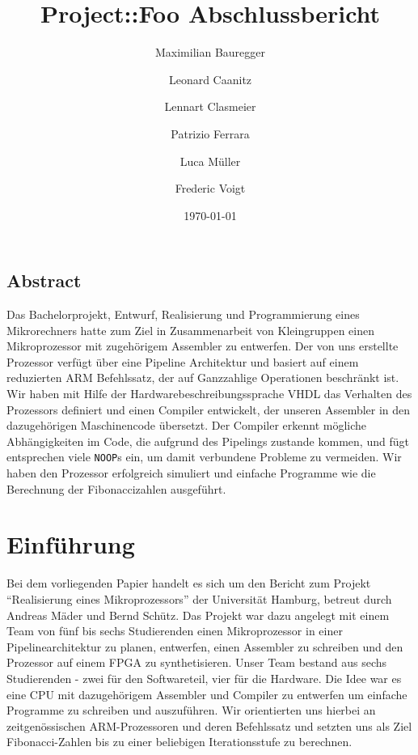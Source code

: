 \documentclass[paper=a4,fontsize=11pt,twocolumn]{scrreprt}
\title{Project::Foo Abschlussbericht}
\author{Maximilian Bauregger \and Leonard Caanitz \and Lennart Clasmeier \and Patrizio Ferrara \and Luca Müller \and Frederic Voigt}
\date{\today}
\begin{document}
\maketitle

\tableofcontents

\section*{Abstract}
Das Bachelorprojekt, Entwurf, Realisierung und Programmierung eines Mikrorechners hatte zum Ziel in Zusammenarbeit von Kleingruppen einen Mikroprozessor mit zugehörigem Assembler zu entwerfen.
Der von uns erstellte Prozessor verfügt über eine Pipeline Architektur und basiert auf einem reduzierten ARM Befehlssatz, der auf Ganzzahlige Operationen beschränkt ist.
Wir haben mit Hilfe der Hardwarebeschreibungssprache VHDL das Verhalten des Prozessors definiert und einen Compiler entwickelt, der unseren Assembler in den dazugehörigen Maschinencode übersetzt.
Der Compiler erkennt mögliche Abhängigkeiten im Code, die aufgrund des Pipelings zustande kommen, und fügt entsprechen viele \texttt{NOOP}s ein, um damit verbundene Probleme zu vermeiden.
Wir haben den Prozessor erfolgreich simuliert und einfache Programme wie die Berechnung der Fibonaccizahlen ausgeführt.

\chapter{Einführung}
Bei dem vorliegenden Papier handelt es sich um den Bericht zum Projekt \enquote{Realisierung eines Mikroprozessors} der Universität Hamburg, betreut durch Andreas Mäder und Bernd Schütz.
Das Projekt war dazu angelegt mit einem Team von fünf bis sechs Studierenden einen Mikroprozessor in einer Pipelinearchitektur zu planen, entwerfen, einen Assembler zu schreiben und den Prozessor auf einem FPGA zu synthetisieren.
Unser Team bestand aus sechs Studierenden - zwei für den Softwareteil, vier für die Hardware.
Die Idee war es eine CPU mit dazugehörigem Assembler und Compiler zu entwerfen um einfache Programme zu schreiben und auszuführen.
Wir orientierten uns hierbei an zeitgenössischen ARM-Prozessoren und deren Befehlssatz und setzten uns als Ziel Fibonacci-Zahlen bis zu einer beliebigen Iterationsstufe zu berechnen.
\end{document}
